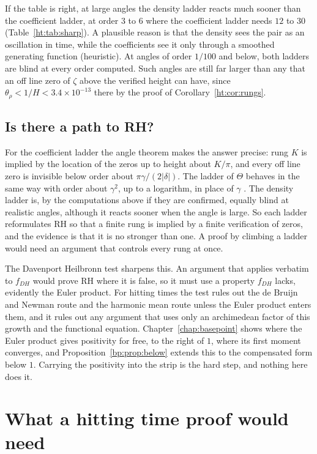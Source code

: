 If the table is right, at large angles the density ladder reacts much sooner than the coefficient ladder, at order $3$ to $6$ where the coefficient ladder needs $12$ to $30$ (Table~\ref{ht:tab:sharp}). A plausible reason is that the density sees the pair as an oscillation in time, while the coefficients see it only through a smoothed generating function (heuristic). At angles of order $1/100$ and below, both ladders are blind at every order computed. Such angles are still far larger than any that an off line zero of $\zeta$ above the verified height can have, since $\theta_\rho<1/H<3.4\times10^{-13}$ there by the proof of Corollary~\ref{ht:cor:rungs}.

\subsection{Is there a path to RH?}\label{ht:sec:path}

For the coefficient ladder the angle theorem makes the answer precise: rung $K$ is implied by the location of the zeros up to height about $K/\pi$, and every off line zero is invisible below order about $\pi\gamma/(2|\delta|)$. The ladder of $\Theta$ behaves in the same way with order about $\gamma^2$, up to a logarithm, in place of $\gamma$ \cite[Section 6]{P17}. The density ladder is, by the computations above if they are confirmed, equally blind at realistic angles, although it reacts sooner when the angle is large. So each ladder reformulates RH so that a finite rung is implied by a finite verification of zeros, and the evidence is that it is no stronger than one. A proof by climbing a ladder would need an argument that controls every rung at once.

The Davenport Heilbronn test sharpens this. An argument that applies verbatim to $f_{DH}$ would prove RH where it is false, so it must use a property $f_{DH}$ lacks, evidently the Euler product. For hitting times the test rules out the de Bruijn and Newman route and the harmonic mean route unless the Euler product enters them, and it rules out any argument that uses only an archimedean factor of this growth and the functional equation. Chapter~\ref{chap:basepoint} shows where the Euler product gives positivity for free, to the right of $1$, where its first moment converges, and Proposition~\ref{bp:prop:below} extends this to the compensated form below $1$. Carrying the positivity into the strip is the hard step, and nothing here does it.

\section{What a hitting time proof would need}\label{ht:sec:need}

